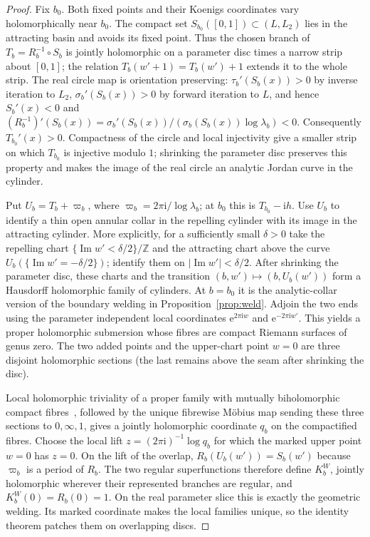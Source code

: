 \documentclass[11pt]{amsart}
\theoremstyle{definition}
\newcommand{\Rr}{R}
\newcommand{\Kk}{K}
\newcommand{\eee}{\mathrm{e}}
\newcommand{\ii}{\mathrm{i}}
\begin{document}
\begin{proof}
Fix $b_0$.  Both fixed points and their Koenigs coordinates vary
holomorphically near $b_0$.  The compact set
$S_{b_0}([0,1])\subset(L,L_2)$ lies in the attracting basin and avoids its
fixed point.  Thus the chosen branch of
$T_b=\Rr_b^{-1}\circ S_b$ is jointly holomorphic on a parameter disc times
a narrow strip about $[0,1]$; the relation $T_b(w'+1)=T_b(w')+1$
extends it to the whole strip.  The real circle map is orientation
preserving: $\tau_b'(S_b(x))>0$ by inverse iteration to $L_2$,
$\sigma_b'(S_b(x))>0$ by forward iteration to $L$, and hence
$S_b'(x)<0$ and
$(\Rr_b^{-1})'(S_b(x))=\sigma_b'(S_b(x))/
 (\sigma_b(S_b(x))\log\lambda_b)<0$.
Consequently $T_{b_0}'(x)>0$.  Compactness of the circle and local
injectivity give a smaller strip on which $T_{b_0}$ is injective modulo
$1$; shrinking the parameter disc preserves this property and makes the
image of the real circle an analytic Jordan curve in the cylinder.

Put $U_b=T_b+\varpi_b$, where
$\varpi_b=2\pi\ii/\log\lambda_b$; at $b_0$ this is $T_{b_0}-\ii h$.
Use $U_b$ to identify a thin open annular collar in the repelling
cylinder with its image in the attracting cylinder.  More explicitly,
for a sufficiently small $\delta>0$ take the repelling chart
$\{\operatorname{Im}w'<\delta/2\}/\mathbb Z$ and the attracting chart
above the curve $U_b(\{\operatorname{Im}w'=-\delta/2\})$; identify them
on $|\operatorname{Im}w'|<\delta/2$.  After shrinking the parameter disc,
these charts and the transition $(b,w')\mapsto(b,U_b(w'))$ form a
Hausdorff holomorphic family of cylinders.  At $b=b_0$ it is the
analytic-collar version of the boundary welding in
Proposition~\ref{prop:weld}.  Adjoin the two ends using the parameter
independent local coordinates $\eee^{2\pi\ii w}$ and
$\eee^{-2\pi\ii w'}$.  This yields a proper holomorphic submersion
whose fibres are compact Riemann surfaces of genus zero.  The two added
points and the upper-chart point $w=0$ are three disjoint holomorphic
sections (the last remains above the seam after shrinking the disc).

Local holomorphic triviality of a proper family with mutually
biholomorphic compact fibres~\cite{FischerGrauert1965}, followed by the
unique fibrewise M\"obius map sending these three sections to $0,\infty,1$,
gives a jointly holomorphic coordinate $q_b$ on the compactified fibres.
Choose the local lift $z=(2\pi\ii)^{-1}\log q_b$ for which the marked
upper point $w=0$ has $z=0$.  On the lift of the overlap,
$\Rr_b(U_b(w'))=S_b(w')$ because $\varpi_b$ is a period of $\Rr_b$.
The two regular superfunctions therefore define $\Kk_b^W$, jointly
holomorphic wherever their represented branches are regular, and
$\Kk_b^W(0)=\Rr_b(0)=1$.  On the real parameter slice this is exactly
the geometric welding.  Its marked coordinate makes the local families
unique, so the identity theorem patches them on overlapping discs.
\end{proof}
\end{document}
